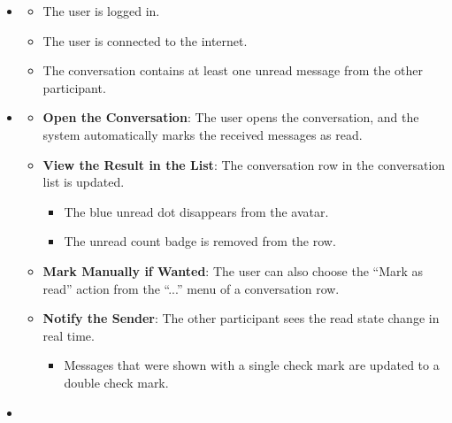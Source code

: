 \begin{itemize}[leftmargin=1.6em,topsep=4pt,itemsep=3pt,parsep=0pt,label=$\bullet$]
    \item {}

        \begin{itemize}[leftmargin=2.2em,topsep=2pt,itemsep=3pt,parsep=0pt,label=$\circ$]
            \item The user is logged in.
            \item The user is connected to the internet.
            \item The conversation contains at least one unread message from the other participant.
        \end{itemize}
    \item {}

        \begin{itemize}[leftmargin=2.2em,topsep=2pt,itemsep=3pt,parsep=0pt,label=$\circ$]
            \item \textbf{Open the Conversation}: The user opens the conversation, and the system automatically marks the received messages as read.
            \item \textbf{View the Result in the List}: The conversation row in the conversation list is updated.
                \begin{itemize}[leftmargin=2.2em,topsep=2pt,itemsep=3pt,parsep=0pt,label=$\blacksquare$]
                    \item The blue unread dot disappears from the avatar.
                    \item The unread count badge is removed from the row.
                \end{itemize}
            \item \textbf{Mark Manually if Wanted}: The user can also choose the ``Mark as read'' action from the ``...'' menu of a conversation row.
            \item \textbf{Notify the Sender}: The other participant sees the read state change in real time.
                \begin{itemize}[leftmargin=2.2em,topsep=2pt,itemsep=3pt,parsep=0pt,label=$\blacksquare$]
                    \item Messages that were shown with a single check mark are updated to a double check mark.
                \end{itemize}
        \end{itemize}
    \item {}


\end{itemize}
